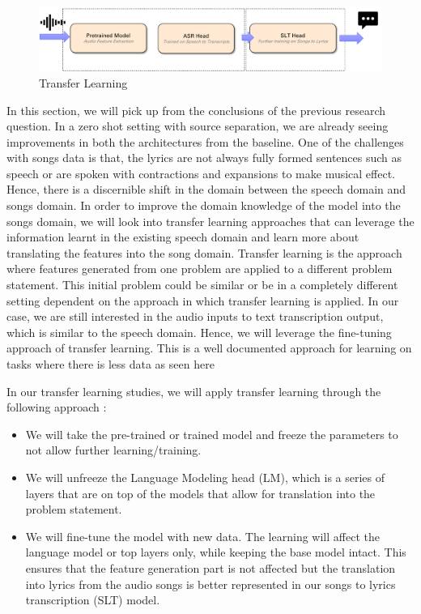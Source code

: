     \begin{figure} [H]
    \centering
    \includegraphics[width=1.0\textwidth]{05-research study/figures/transferlearning.pdf}
    \caption{Transfer Learning}
    \label{fig:transferlearning}
\end{figure}

In this section, we will pick up from the conclusions of the previous research question. In a zero shot setting with source separation, we are already seeing improvements in both the architectures from the baseline. One of the challenges with songs data is that, the lyrics are not always fully formed sentences such as speech or are spoken with contractions and expansions to make musical effect. Hence, there is a discernible shift in the domain between the speech domain and songs domain. In order to improve the domain knowledge of the model into the songs domain, we will look into transfer learning approaches that can leverage the information learnt in the existing speech domain and learn more about translating the features into the song domain. 
Transfer learning is the approach where features generated from one problem are applied to a different problem statement. This initial problem could be similar or be in a completely different setting dependent on the approach in which transfer learning is applied. In our case, we are still interested in the audio inputs to text transcription output, which is similar to the speech domain. Hence, we will leverage the fine-tuning approach of transfer learning. This is a well documented approach for learning on tasks where there is less data as seen here \cite{buragohain2022deep} \cite{hosna2022transfer}


In our transfer learning studies, we will apply transfer learning through the following approach : 
\begin{itemize}
    \item We will take the pre-trained or trained model and freeze the parameters to not allow further learning/training.
    \item We will unfreeze the Language Modeling head (LM), which is a series of layers that are on top of the models that allow for translation into the problem statement.
    \item We will fine-tune the model with new data. The learning will affect the language model or top layers only, while keeping the base model intact. This ensures that the feature generation part is not affected but the translation into lyrics from the audio songs is better represented in our songs to lyrics transcription (SLT) model.
\end{itemize}

